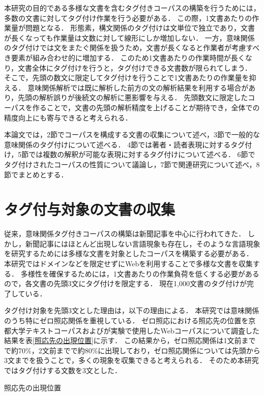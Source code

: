 \documentclass[japanese]{jnlp_1.4}
\begin{document}
本研究の目的である多様な文書を含むタグ付きコーパスの構築を行うためには，多数の文書に対してタグ付け作業を行う必要がある．
この際，1文書あたりの作業量が問題となる．
形態素，構文関係のタグ付けは文単位で独立であり，文書が長くなっても作業量は文数に対して線形にしか増加しない．
一方，意味関係のタグ付けでは文をまたぐ関係を扱うため，文書が長くなると作業者が考慮すべき要素が組み合わせ的に増加する．
このため1文書あたりの作業時間が長くなり，文書全体にタグ付けを行うと，タグ付けできる文書数が限られてしまう．
そこで，先頭の数文に限定してタグ付けを行うことで1文書あたりの作業量を抑える．
意味関係解析では既に解析した前方の文の解析結果を利用する場合があり，先頭の解析誤りが後続文の解析に悪影響を与える．
先頭数文に限定したコーパスを作ることで，文書の先頭の解析精度を上げることが期待でき，全体での精度向上にも寄与できると考えられる．



本論文では，2節でコーパスを構成する文書の収集について述べ，3節で一般的な意味関係のタグ付けについて述べる．
4節では著者・読者表現に対するタグ付け，5節では複数の解釈が可能な表現に対するタグ付けについて述べる．
6節でタグ付けされたコーパスの性質について議論し，7節で関連研究について述べ，8節でまとめとする．


\section{タグ付与対象の文書の収集}

従来，意味関係タグ付きコーパスの構築は新聞記事を中心に行われてきた\cite{KTC,NTC}．
しかし，新聞記事にはほとんど出現しない言語現象も存在し，そのような言語現象を研究するためには多様な文書を対象としたコーパスを構築する必要がある．
本研究ではドメインなどを限定せずにWebを利用することで多様な文書を収集する．
多様性を確保するためには，1文書あたりの作業負荷を低くする必要があるので，各文書の先頭3文にタグ付けを限定する．
現在1,000文書のタグ付けが完了している．

タグ付け対象を先頭3文とした理由は，以下の理由による．
本研究では意味関係のうち特にゼロ照応関係を重視している．
ゼロ照応における照応先の位置を京都大学テキストコーパス\cite{KTC}および\cite{sasano-kurohashi:2011:IJCNLP-2011}が実験で使用したWebコーパスについて調査した結果を表\ref{照応先の出現位置}に示す．
この結果から，ゼロ照応関係は1文前までで約70\%，2文前までで約80\%に出現しており，ゼロ照応関係については先頭から3文までを扱うことで，多くの現象を収集できると考えられる．
そのため本研究ではタグ付けする文数を3文とした．

\begin{table}[b]
\caption{照応先の出現位置}
\label{照応先の出現位置}

\end{table}
\end{document}
